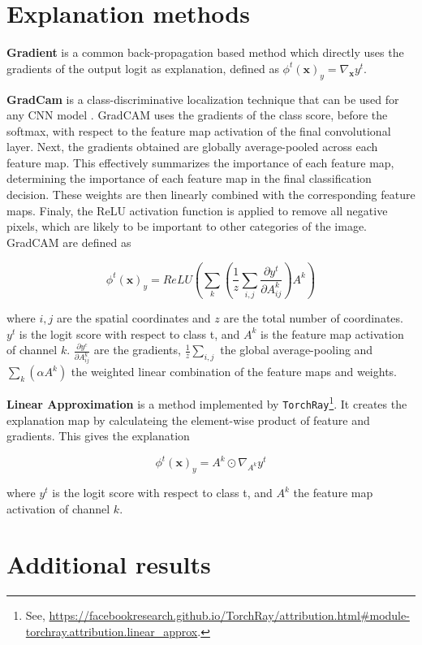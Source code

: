 \section{Explanation methods}
\label{appendix: Explanation methods}

\textbf{Gradient} is a common back-propagation based method which directly uses the gradients of the output logit as explanation, defined as $\phi^t(\mathbf{x})_y = \nabla_\textbf{x}y^t$.

\textbf{GradCam} is a class-discriminative localization technique that can be used for any CNN model \citep{gradcam}. GradCAM uses the gradients of the class score, before the softmax, with respect to the feature map activation of the final convolutional layer. Next, the gradients obtained are globally average-pooled across each feature map. This effectively summarizes the importance of each feature map, determining the importance of each feature map in the final classification decision. These weights are then linearly combined with the corresponding feature maps. Finaly, the ReLU activation function is applied to remove all negative pixels, which are likely to be important to other categories of the image. GradCAM are defined as

\begin{equation}
\phi^t(\mathbf{x})_y = ReLU(\sum_k( \frac{1}{z} \sum_{i,j} \frac{\partial y^t}{\partial A^k_{ij}} ) A^k )
\end{equation}

where $i,j$ are the spatial coordinates and $z$ are the total number of coordinates. $y^t$ is the logit score with respect to class t, and $A^k$ is the feature map activation of channel $k$. $\frac{\partial y^c}{\partial A^k_{ij}}$ are the gradients, $\frac{1}{z} \sum_{i,j}$ the global average-pooling and $\sum_k(\alpha A^k)$ the weighted linear combination of the feature maps and weights.

\textbf{Linear Approximation} is a method implemented by \texttt{TorchRay}\footnote{See, \href{https://facebookresearch.github.io/TorchRay/attribution.html\#module-torchray.attribution.linear\_approx}{https://facebookresearch.github.io/TorchRay/attribution.html\#module-torchray.attribution.linear\_approx}.}. It creates the explanation map by calculateing the element-wise product of feature and gradients. This gives the explanation

\begin{equation}
    \phi^t(\mathbf{x})_y = A^k \odot \nabla_{A^k}y^t
\end{equation}

where $y^t$ is the logit score with respect to class t, and $A^k$ the feature map activation of channel $k$.

\clearpage
\section{Additional results}
\label{app:add_res}


\clearpage

\null

